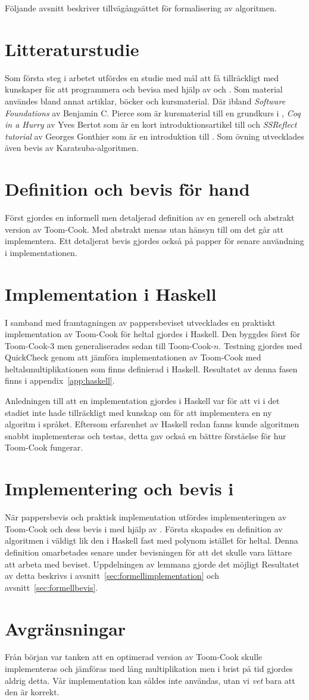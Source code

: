Följande avsnitt beskriver tillvägångsättet för formalisering av algoritmen.

\section{Litteraturstudie}
Som första steg i arbetet utfördes en studie med mål att få tillräckligt med
kunskaper för att programmera och bevisa med hjälp av \coq{} och \ssr{}. Som
material användes bland annat artiklar, böcker och kursmaterial. Där ibland
\emph{Software Foundations} av Benjamin C. Pierce som är kursmaterial till en
grundkurs i \coq{}, \emph{Coq in a Hurry} av Yves Bertot som är en kort
introduktionsartikel till \coq{} och \emph{SSReflect tutorial} av Georges
Gonthier som är en introduktion till \ssr{}. Som övning utvecklades även bevis av
Karatsuba-algoritmen.

\section{Definition och bevis för hand}
Först gjordes en informell men detaljerad definition av en generell och
abstrakt version av Toom-Cook. Med abstrakt menas utan hänsyn till om det går
att implementera. Ett detaljerat bevis gjordes också på papper för senare
användning i implementationen.

\section{Implementation i Haskell}
I samband med framtagningen av pappersbeviset utvecklades en praktiskt
implementation av Toom-Cook för heltal gjordes i Haskell. Den byggdes först för
Toom-Cook-3 men generaliserades sedan till Toom-Cook-$n$. Testning gjordes med
QuickCheck genom att jämföra implementationen av Toom-Cook med
heltalsmultiplikationen som finns definierad i Haskell. Resultatet av denna
fasen finns i appendix~\ref{app:haskell}.

Anledningen till att en implementation gjordes i Haskell var för att vi i det
stadiet inte hade tillräckligt med kunskap om \coq{} för att implementera en ny
algoritm i språket. Eftersom erfarenhet av Haskell redan fanns kunde algoritmen
snabbt implementeras och testas, detta gav också en bättre förståelse för hur
Toom-Cook fungerar.

\section{Implementering och bevis i \coq{}}
När pappersbevis och praktisk implementation utfördes implementeringen av
Toom-Cook och dess bevis i \coq{} med hjälp av \ssr{}. Första skapades en
definition av algoritmen i \coq{} väldigt lik den i Haskell fast med polynom
istället för heltal. Denna definition omarbetades senare under bevisningen för
att det skulle vara lättare att arbeta med beviset. Uppdelningen av lemmana
gjorde det möjligt Resultatet av detta
beskrivs i avsnitt~\ref{sec:formellimplementation} och
avsnitt~\ref{sec:formellbevis}.

\section{Avgränsningar}
Från början var tanken att en optimerad version av Toom-Cook skulle
implementeras och jämföras med lång multiplikation men i brist på tid gjordes
aldrig detta. Vår implementation kan såldes inte användas, utan vi \emph{vet}
bara att den är korrekt.
